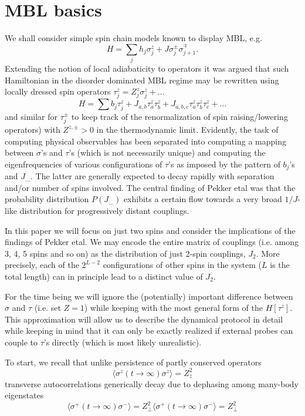 \documentclass[aps,prb,twocolumn,showpacs,superscriptaddress,citeautoscript]{revtex4}  %
\newcommand{\be}{\begin{equation}}
\newcommand{\ee}{\end{equation}}
\begin{document}
\section{MBL basics}
We shall consider simple spin chain models known to display MBL, e.g. 
\be
H=\sum_j h_j \sigma^z_j +J \sigma^\pm_j \sigma^\mp_{j+1}.
\ee
Extending the notion of local adiabaticity to operators it was argued\cite{Abanin,Huse} that such Hamiltonian in the disorder dominated MBL regime may be rewritten using locally dressed spin operators $\tau^z_j =Z^z_j \sigma^z_j+\ldots$ \be
H=\sum b_j \tau^z_j +J_{a,b} \tau^z_a \tau^z_b+J_{a,b,c} \tau^z_a \tau^z_b\tau^z_c+\ldots
\ee 
and similar for $\tau^\pm_j$ to keep track of the renormalization of spin raising/lowering operators) with $Z^{z,\pm}>0$ in the thermodynamic limit.
Evidently, the task of computing physical observables has been separated into computing a mapping between $\sigma$'s and $\tau$'s (which is not necessarily unique) and computing the eigenfrequencies of various configurations of $\tau$'s as imposed by the pattern of $b_j$'s and $J_{\ldots}$. The latter are generally expected to decay rapidly with separation and/or number of spins involved.  The central finding of Pekker etal was that the probability distribution $P(J_{\ldots})$ exhibits a certain flow towards a very broad $1/J$-like distribution for progressively distant couplings.

In this paper we will focus on just two spins and consider the implications of the findings of Pekker etal. We may encode the entire matrix of couplings (i.e. among 3, 4, 5 spins and so on) as the distribution of just 2-spin couplings, $J_2$. More precisely, each of the $2^{L-2}$ configurations of other spins in the system ($L$ is the total length) can in principle lead to a distinct value of $J_2$.

For the time being we will ignore the (potentially) important difference between $\sigma$ and $\tau$ (i.e. set $Z=1$) while keeping with the most general form of the $H[\tau^z]$. This approximation will allow us to describe the dynamical protocol in detail while keeping in mind that it can only be exactly realized if external probes can couple to $\tau$'s directly (which is most likely unrealistic).  

To start, we recall that unlike persistence of partly conserved operators 
\be
\langle \sigma^z(t\to \infty)\sigma^z\rangle=Z_z^2
\ee 
transverse autocorrelations generically decay due to dephasing among many-body eigenstates
\be
\langle \sigma^+(t\to \infty)\sigma^-\rangle=Z_\perp^2 \langle \sigma^+(t\to \infty)\sigma^-\rangle=Z_\perp^2 
\ee 
\end{document}
